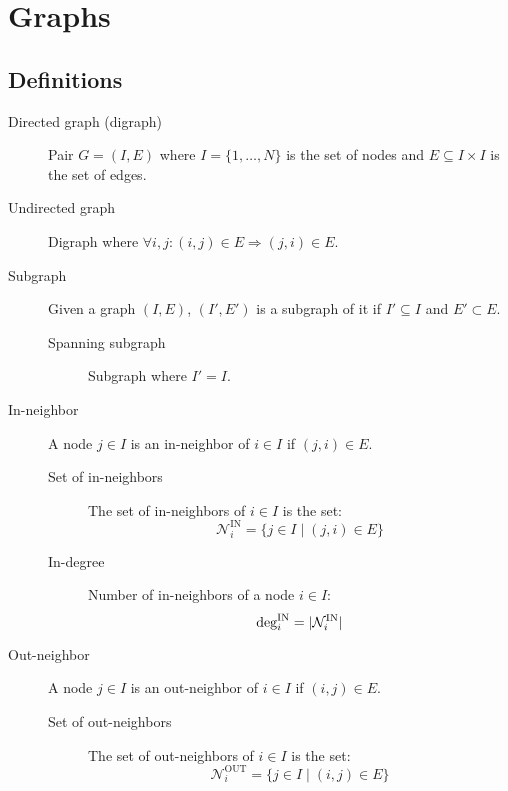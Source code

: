 \chapter{Graphs}


\section{Definitions}

\begin{description}
    \item[Directed graph (digraph)] 
        Pair $G = (I, E)$ where $I=\{1, \dots, N\}$ is the set of nodes and $E \subseteq I \times I$ is the set of edges.

    \item[Undirected graph] 
        Digraph where $\forall i,j: (i, j) \in E \Rightarrow (j, i) \in E$.

    \item[Subgraph] 
        Given a graph $(I, E)$, $(I', E')$ is a subgraph of it if $I' \subseteq I$ and $E' \subset E$.
        \begin{description}
            \item[Spanning subgraph] Subgraph where $I' = I$.
        \end{description}

    \item[In-neighbor] 
        A node $j \in I$ is an in-neighbor of $i \in I$ if $(j, i) \in E$.

        \begin{description}
            \item[Set of in-neighbors] 
                The set of in-neighbors of $i \in I$ is the set:
                \[ \mathcal{N}_i^\text{IN} = \{ j \in I \mid (j, i) \in E \} \] 

            \item[In-degree] 
                Number of in-neighbors of a node $i \in I$:
                \[ \indeg[i] = | \mathcal{N}_i^\text{IN} | \] 
        \end{description}

    \item[Out-neighbor] 
        A node $j \in I$ is an out-neighbor of $i \in I$ if $(i, j) \in E$.

        \begin{description}
            \item[Set of out-neighbors] 
                The set of out-neighbors of $i \in I$ is the set:
                \[ \mathcal{N}_i^\text{OUT} = \{ j \in I \mid (i, j) \in E \} \] 


\end{description}
\end{description}

